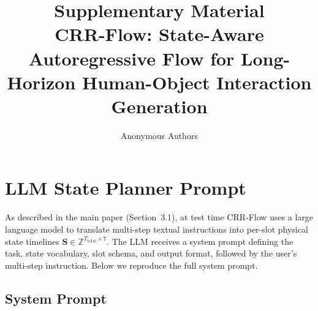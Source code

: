 \documentclass[sigconf, screen, review, anonymous]{acmart}
\begin{document}
\title{Supplementary Material\\ CRR-Flow: State-Aware Autoregressive Flow for Long-Horizon Human-Object Interaction Generation}

\author{Anonymous Authors}

\renewcommand{\shortauthors}{Anonymous Authors}


\maketitle

\setcounter{section}{0}
\renewcommand{\thesection}{\Alph{section}}


\section{LLM State Planner Prompt}
\label{sec:llm_prompt}

As described in the main paper (Section~3.1), at test time CRR-Flow uses a large language model to translate multi-step textual instructions into per-slot physical state timelines $\mathbf{S} \in \mathbb{Z}^{T_{\text{total}} \times 7}$. The LLM receives a system prompt defining the task, state vocabulary, slot schema, and output format, followed by the user's multi-step instruction. Below we reproduce the full system prompt.

\subsection{System Prompt}
\end{document}
